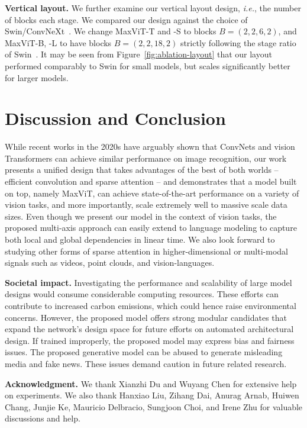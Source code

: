 \documentclass[runningheads]{llncs}
\def\ie{\emph{i.e.}, }
\begin{document}
\noindent\textbf{Vertical layout.} We further examine our vertical layout design, \ie the number of blocks each stage. We compared our design against the choice of Swin/ConvNeXt~\cite{liu2021swin,liu2022convnet}. We change MaxViT-T and -S to blocks $B=(2,2,6,2)$, and MaxViT-B, -L to have blocks $B=(2,2,18,2)$ strictly following the stage ratio of Swin~\cite{liu2021swin}. It may be seen from Figure~\ref{fig:ablation-layout} that our layout performed comparably to Swin for small models, but scales significantly better for larger models.





\section{Discussion and Conclusion}
While recent works in the 2020s have arguably shown that ConvNets and vision Transformers can achieve similar performance on image recognition, our work presents a unified design that takes advantages of the best of both worlds -- efficient convolution and sparse attention -- and demonstrates that a model built on top, namely MaxViT, can achieve state-of-the-art performance on a variety of vision tasks, and more importantly, scale extremely well to massive scale data sizes.
Even though we present our model in the context of vision tasks, the proposed multi-axis approach can easily extend to language modeling to capture both local and global dependencies in linear time.
We also look forward to studying other forms of sparse attention in higher-dimensional or multi-modal signals such as videos, point clouds, and vision-languages.


\noindent\textbf{Societal impact.}
Investigating the performance and scalability of large model designs would consume considerable computing resources. These efforts can contribute to increased carbon emissions, which could hence raise environmental concerns. However, the proposed model offers strong modular candidates that expand the network's design space for future efforts on automated architectural design. If trained improperly, the proposed model may express bias and fairness issues. The proposed generative model can be abused to generate misleading media and fake news. These issues demand caution in future related research.

\noindent\textbf{Acknowledgment.}
We thank Xianzhi Du and Wuyang Chen for extensive help on experiments. We also thank Hanxiao Liu, Zihang Dai, Anurag Arnab, Huiwen Chang, Junjie Ke, Mauricio Delbracio, Sungjoon Choi, and Irene Zhu for valuable discussions and help.
\end{document}
